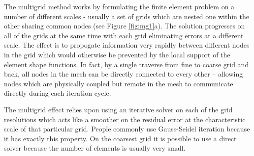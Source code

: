\documentclass[10pt]{article}
\begin{document}
	The multigrid method works by formulating the finite element problem
	on a number of different scales - usually a set of grids which are nested
	one within the other sharing common nodes (see Figure \ref{fig:mg1}a).  The solution 
	progresses on all of the grids at the same time with each grid eliminating
	errors at a different scale. The effect is to propogate information very 
	rapidly between different nodes in the grid which would otherwise be
	prevented by the local support of the element shape functions. In fact,
	by a single traverse from fine to coarse grid and back, all nodes in the mesh 
	can be directly connected to every other -- allowing nodes which are physically
	coupled but remote in the mesh to communicate directly during each iteration
	cycle. 

	The multigrid effect relies upon using an iterative solver on each
	of the grid resolutions which acts like a smoother on the residual
	error at the characteristic scale of that particular grid. People commonly use
	Gauss-Seidel iteration because it has exactly this property. On the coarsest
	grid it is possible to use a direct solver because the number of elements
	is usually very small.
\end{document}
